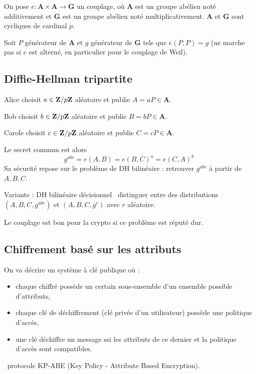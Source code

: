 On pose $e \colon \mathbf{A} \times \mathbf{A} \to \mathbf{G}$ un couplage, où $\mathbf{A}$ est un groupe abélien noté additivement et $\mathbf{G}$ est un groupe abélien noté multiplicativement.
$\mathbf{A}$ et $\mathbf{G}$ sont cycliques de cardinal $p$.

Soit $P$ générateur de $\mathbf{A}$ et $g$ générateur de $\mathbf{G}$ tels que $e(P,P) = g$ (ne marche pas si $e$ est alterné, en particulier pour le couplage de Weil).


\subsection{Diffie-Hellman tripartite}

	Alice choisit $a \in \mathbf{Z} / p\mathbf{Z}$ aléatoire et publie $A = aP \in \mathbf{A}$.
	
	Bob choisit $b \in \mathbf{Z} / p\mathbf{Z}$ aléatoire et publie $B = bP \in \mathbf{A}$.
	
	Carole choisit $c \in \mathbf{Z} / p\mathbf{Z}$ aléatoire et publie $C = cP \in \mathbf{A}$.
	
	Le secret commun est alors
	$$g^{abc} = e(A,B) = e(B,C)^a = e(C,A)^b$$
	Sa sécurité repose sur le problème de DH bilinéaire : retrouver $g^{abc}$ à partir de $A,B,C$.
	
	Variante : DH bilinéaire décisionnel \textrightarrow\ distinguer entre des distributions $(A,B,C,g^{abc})$ et $(A,B,C,g^r)$ avec $r$ aléatoire.
	
	Le couplage est bon pour la crypto si ce problème est réputé dur.


\subsection{Chiffrement basé sur les attributs}

	On va décrire un système à clé publique où :
	\begin{itemize}
		\item[\textbullet] chaque chiffré possède un certain sous-ensemble d'un ensemble possible d'attributs,
		\item[\textbullet] chaque clé de déchiffrement (clé privée d'un utilisateur) possède une politique d'accès,
		\item[\textbullet] une clé déchiffre un message ssi les attributs de ce dernier et la politique d'accès sont compatibles.
	\end{itemize}
	
	\textrightarrow\ protocole KP-ABE (Key Policy - Attribute Based Encryption).
	
